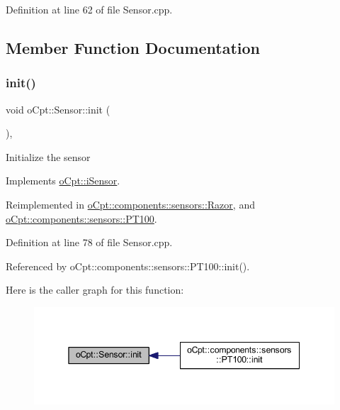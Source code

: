 Definition at line 62 of file Sensor.\+cpp.



\subsection{Member Function Documentation}
\hypertarget{classo_cpt_1_1_sensor_aa612a305a9a3091dd62cd1afb9d4dd7d}{}\label{classo_cpt_1_1_sensor_aa612a305a9a3091dd62cd1afb9d4dd7d} 
\subsubsection{\texorpdfstring{init()}{init()}}
{\footnotesize\ttfamily void o\+Cpt\+::\+Sensor\+::init (\begin{DoxyParamCaption}{ }\end{DoxyParamCaption})\hspace{0.3cm}{\ttfamily [override]}, {\ttfamily [virtual]}}

Initialize the sensor 

Implements \hyperlink{classo_cpt_1_1i_sensor_aa8def4a41b8280f7e4e02285cd7bd734}{o\+Cpt\+::i\+Sensor}.



Reimplemented in \hyperlink{classo_cpt_1_1components_1_1sensors_1_1_razor_a1dd2b5a9fbac3c9510e2d3771abf358b}{o\+Cpt\+::components\+::sensors\+::\+Razor}, and \hyperlink{classo_cpt_1_1components_1_1sensors_1_1_p_t100_a296d0c3c2a55df465e127462c8c30215}{o\+Cpt\+::components\+::sensors\+::\+P\+T100}.



Definition at line 78 of file Sensor.\+cpp.



Referenced by o\+Cpt\+::components\+::sensors\+::\+P\+T100\+::init().

Here is the caller graph for this function\+:\nopagebreak
\begin{figure}[H]
\begin{center}
\leavevmode
\includegraphics[width=345pt]{classo_cpt_1_1_sensor_aa612a305a9a3091dd62cd1afb9d4dd7d_icgraph}
\end{center}
\end{figure}
\hypertarget{classo_cpt_1_1_sensor_aef25b0e5f3a8358ee81c97c73909fbe6}{}\label{classo_cpt_1_1_sensor_aef25b0e5f3a8358ee81c97c73909fbe6} 
